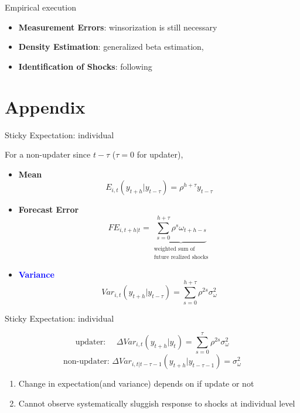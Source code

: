 \documentclass{beamer}
\begin{document}
\begin{frame}{Empirical execution}

\begin{itemize}
	\item \textbf{Measurement Errors}:  winsorization is still necessary
	\item \textbf{Density Estimation}: generalized beta estimation, \cite{engelberg2009comparing}
    \item \textbf{Identification of Shocks}: following \cite{coibion2012can}
\end{itemize}

\end{frame}




\section{Appendix}




\begin{frame}{Sticky Expectation: individual}

For a non-updater since $t-\tau$ ($\tau=0$ for updater),
\begin{itemize}
\item \textbf{Mean} $$E_{i,t}(y_{t+h}|y_{t-\tau}) = \rho^{h+\tau} y_{t-\tau}$$  
\item \textbf{Forecast Error} $$FE_{i,t+h|t} = \underbrace{\sum^{h+\tau}_{s=0} \rho^s \omega_{t+h-s}}_{\substack{\text{weighted sum of} \\ \text{future realized shocks}} }$$
\item \textcolor{blue}{\textbf{Variance}} $$Var_{i,t}(y_{t+h}|y_{t-\tau}) = \sum^{h+\tau}_{s=0}\rho^{2s} \sigma^2_{\omega}$$	
\end{itemize}

\end{frame}


\begin{frame}{Sticky Expectation: individual}

$$\text{updater: } \quad \Delta Var_{i,t}(y_{t+h}|y_t)= \sum^{\tau}_{s=0} \rho^{2s}\sigma^2_{\omega}$$
$$\text{non-updater: }  \Delta Var_{i,t|t-\tau-1}(y_{t+h}|y_{t-\tau-1})  = \sigma^2_{\omega}$$


\begin{enumerate}
\item Change in expectation(and variance) depends on if update or not 
\item Cannot observe systematically sluggish response to shocks at individual level 
\end{enumerate}

\end{frame}
\end{document}
